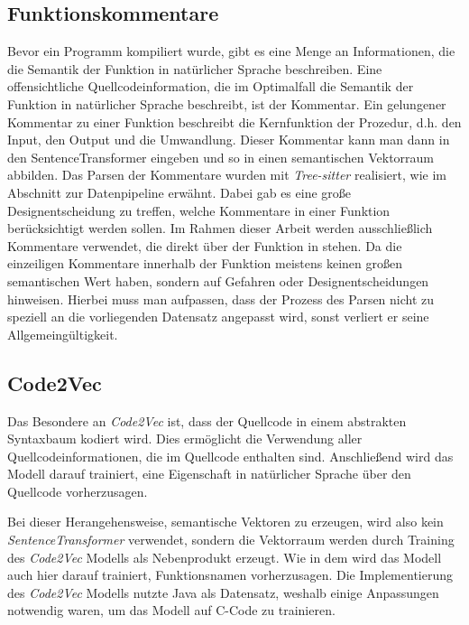\documentclass[12pt,letterpaper,ngerman]{article}
\begin{document}
\subsection{Funktionskommentare}
Bevor ein Programm kompiliert wurde, gibt es eine Menge an
Informationen, die die Semantik der Funktion in natürlicher Sprache 
beschreiben. Eine offensichtliche Quellcodeinformation, die im
Optimalfall die Semantik der Funktion in natürlicher Sprache 
beschreibt, ist der Kommentar. Ein gelungener Kommentar zu einer
Funktion beschreibt die Kernfunktion der Prozedur, d.h. den Input,
den Output und die Umwandlung. Dieser Kommentar kann man dann in den 
SentenceTransformer  eingeben und  so in einen semantischen 
Vektorraum abbilden.
Das Parsen der Kommentare wurden mit \textit{Tree-sitter} realisiert,
wie im Abschnitt zur Datenpipeline erwähnt. Dabei gab es eine große
Designentscheidung zu treffen, welche Kommentare in einer Funktion
berücksichtigt werden sollen.
Im Rahmen dieser Arbeit werden ausschließlich Kommentare verwendet,
die direkt  über der Funktion in stehen. Da die einzeiligen Kommentare
innerhalb der Funktion meistens keinen großen semantischen Wert haben,
sondern auf Gefahren oder Designentscheidungen  hinweisen.
Hierbei muss man aufpassen, dass der Prozess des Parsen nicht zu
speziell an die vorliegenden Datensatz angepasst wird, sonst 
verliert er seine Allgemeingültigkeit. 

\pagebreak
\subsection{Code2Vec}
Das Besondere an \textit{Code2Vec} ist, dass der Quellcode in einem
abstrakten Syntaxbaum kodiert wird. Dies ermöglicht die Verwendung aller
Quellcodeinformationen, die im Quellcode enthalten sind. Anschließend wird
das Modell darauf trainiert, eine Eigenschaft in natürlicher Sprache
über den Quellcode vorherzusagen.

Bei dieser Herangehensweise, semantische Vektoren zu erzeugen, wird
also kein \textit{SentenceTransformer}
verwendet, sondern die Vektorraum werden durch Training des
\textit{Code2Vec} Modells als Nebenprodukt erzeugt. Wie in dem 
\cite{code2vec} wird
das Modell auch hier darauf trainiert, Funktionsnamen 
vorherzusagen. Die Implementierung des \textit{Code2Vec} Modells
nutzte Java als Datensatz, weshalb einige Anpassungen notwendig waren,
um das Modell auf C-Code zu trainieren.
\end{document}
